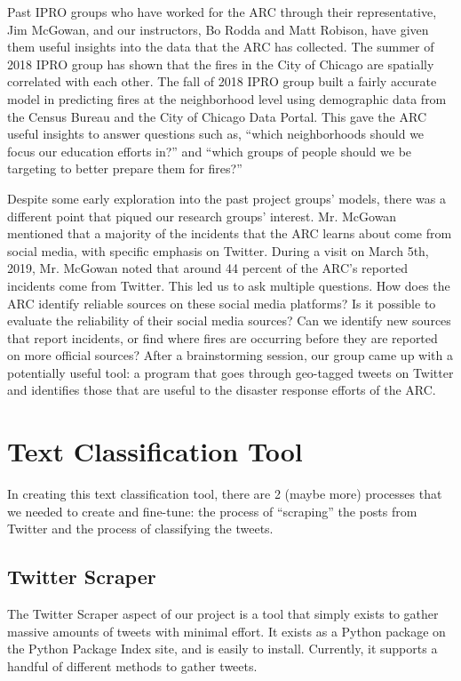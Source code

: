 \documentclass[titlepage, 12pt]{article}
\begin{document}
Past IPRO groups who have worked for the ARC through their representative, Jim McGowan, and our instructors, Bo Rodda and Matt Robison, have given them useful insights into the data that the ARC has collected. The summer of 2018 IPRO group has shown that the fires in the City of Chicago are spatially correlated with each other. The fall of 2018 IPRO group built a fairly accurate model in predicting fires at the neighborhood level using demographic data from the Census Bureau and the City of Chicago Data Portal. This gave the ARC useful insights to answer questions such as, ``which neighborhoods should we focus our education efforts in?'' and ``which groups of people should we be targeting to better prepare them for fires?''

Despite some early exploration into the past project groups' models, there was a different point that piqued our research groups' interest. Mr. McGowan mentioned that a majority of the incidents that the ARC learns about come from social media, with specific emphasis on Twitter. During a visit on March 5th, 2019, Mr. McGowan noted that around 44 percent of the ARC's reported incidents come from Twitter. This led us to ask multiple questions. How does the ARC identify reliable sources on these social media platforms? Is it possible to evaluate the reliability of their social media sources? Can we identify new sources that report incidents, or find where fires are occurring before they are reported on more official sources? After a brainstorming session, our group came up with a potentially useful tool: a program that goes through geo-tagged tweets on Twitter and identifies those that are useful to the disaster response efforts of the ARC.

\section{Text Classification Tool}
 \hspace{0.5 cm}In creating this text classification tool, there are 2 (maybe more) processes that we needed to create and fine-tune: the process of ``scraping'' the posts from Twitter and the process of classifying the tweets.
\subsection{Twitter Scraper}
 \hspace{0.5 cm}The Twitter Scraper aspect of our project is a tool that simply exists to gather massive amounts of tweets with minimal effort. It exists as a Python package on the Python Package Index site, and is easily to install. Currently, it supports a handful of different methods to gather tweets.
\end{document}

